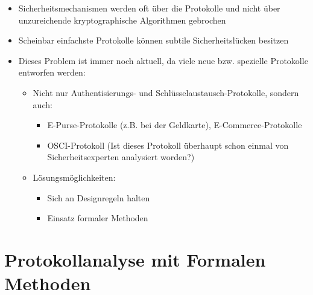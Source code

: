 \documentclass[openany]{book}
\begin{document}
\begin{itemize}
    \item Sicherheitsmechanismen werden oft über die Protokolle und nicht über unzureichende kryptographische Algorithmen gebrochen
    \item Scheinbar einfachste Protokolle können subtile Sicherheitslücken besitzen
    \item Dieses Problem ist immer noch aktuell, da viele neue bzw. spezielle Protokolle entworfen werden:
    \begin{itemize}
        \item Nicht nur Authentisierungs- und Schlüsselaustausch-Protokolle, sondern auch:
        \begin{itemize}
            \item E-Purse-Protokolle (z.B. bei der Geldkarte), E-Commerce-Protokolle
            \item OSCI-Protokoll (Ist dieses Protokoll überhaupt schon einmal von Sicherheitsexperten analysiert worden?)
        \end{itemize}
        \item Lösungsmöglichkeiten:
        \begin{itemize}
            \item Sich an Designregeln halten
            \item Einsatz formaler Methoden
        \end{itemize}
    \end{itemize}
\end{itemize}

\section{Protokollanalyse mit Formalen Methoden}
\end{document}
